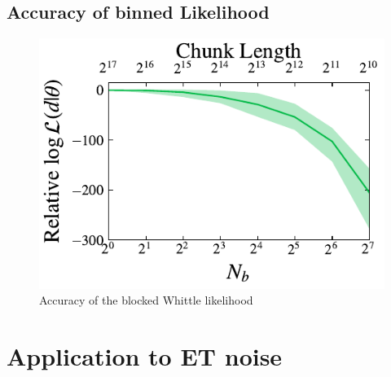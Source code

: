 \documentclass[%
 reprint,
 amsmath,amssymb,
 aps,
]{revtex4-2}
\begin{document}
\subsection{Accuracy of binned Likelihood}

\begin{figure}[h]
  \includegraphics[width=\columnwidth]{lnl_vs_nchunks}
  \caption{Accuracy of the blocked  Whittle likelihood}
  \label{lnl_vs_nchunks}
\end{figure}




\section{Application to ET noise}
\label{sec:application}
\end{document}
